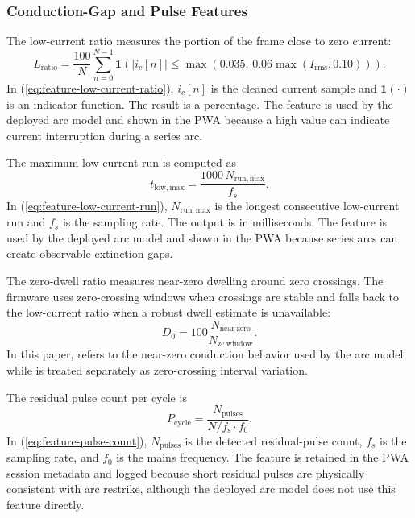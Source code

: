 \subsubsection{Conduction-Gap and Pulse Features}
\label{sec:ch3-gap-pulse-features}

The low-current ratio measures the portion of the frame close to zero current:
\begin{equation}
  L_{\mathrm{ratio}} =
  \frac{100}{N}\sum_{n=0}^{N-1}
  \mathbf{1}
  \left(
  |i_c[n]| \leq
  \max(0.035,\,0.06\max(I_{\mathrm{rms}},0.10))
  \right).
  \label{eq:feature-low-current-ratio}
\end{equation}
In (\ref{eq:feature-low-current-ratio}), $i_c[n]$ is the cleaned current
sample and $\mathbf{1}(\cdot)$ is an indicator function. The result is a
percentage. The feature  is used by the deployed
arc model and shown in the PWA because a high value can indicate current
interruption during a series arc.

The maximum low-current run is computed as
\begin{equation}
  t_{\mathrm{low,max}} =
  \frac{1000\,N_{\mathrm{run,max}}}{f_s}.
  \label{eq:feature-low-current-run}
\end{equation}
In (\ref{eq:feature-low-current-run}), $N_{\mathrm{run,max}}$ is the longest
consecutive low-current run and $f_s$ is the sampling rate. The output is in
milliseconds. The feature  is used by the
deployed arc model and shown in the PWA because series arcs can create
observable extinction gaps.

The zero-dwell ratio measures near-zero dwelling around zero crossings. The
firmware uses zero-crossing windows when crossings are stable and falls back
to the low-current ratio when a robust dwell estimate is unavailable:
\begin{equation}
  D_0 =
  100\frac{N_{\mathrm{near\ zero}}}{N_{\mathrm{zc\ window}}}.
  \label{eq:feature-zero-dwell}
\end{equation}
In this paper,  refers to the near-zero conduction
behavior used by the arc model, while  is treated separately as
zero-crossing interval variation.

The residual pulse count per cycle is
\begin{equation}
  P_{\mathrm{cycle}} =
  \frac{N_{\mathrm{pulses}}}{N/f_{\mathrm{s}}\cdot f_0}.
  \label{eq:feature-pulse-count}
\end{equation}
In (\ref{eq:feature-pulse-count}), $N_{\mathrm{pulses}}$ is the detected
residual-pulse count, $f_s$ is the sampling rate, and $f_0$ is the mains
frequency. The feature  is retained in the PWA
session metadata and logged because short residual pulses are physically
consistent with arc restrike, although the deployed arc model does not use
this feature directly.

